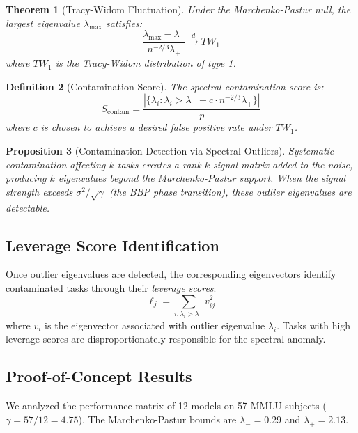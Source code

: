 \documentclass[11pt]{article}
\newtheorem{theorem}{Theorem}[section]
\newtheorem{definition}[theorem]{Definition}
\newtheorem{proposition}[theorem]{Proposition}
\begin{document}
\begin{theorem}[Tracy-Widom Fluctuation]
Under the Marchenko-Pastur null, the largest eigenvalue $\lambda_{\max}$ satisfies:
\begin{equation}
\frac{\lambda_{\max} - \lambda_+}{n^{-2/3} \lambda_+} \xrightarrow{d} TW_1
\end{equation}
where $TW_1$ is the Tracy-Widom distribution of type 1.
\end{theorem}

\begin{definition}[Contamination Score]
The \emph{spectral contamination score} is:
\begin{equation}
S_{\text{contam}} = \frac{|\{\lambda_i : \lambda_i > \lambda_+ + c \cdot n^{-2/3}\lambda_+\}|}{p}
\end{equation}
where $c$ is chosen to achieve a desired false positive rate under $TW_1$.
\end{definition}

\begin{proposition}[Contamination Detection via Spectral Outliers]
Systematic contamination affecting $k$ tasks creates a rank-$k$ signal matrix added to the noise, producing $k$ eigenvalues beyond the Marchenko-Pastur support. When the signal strength exceeds $\sigma^2/\sqrt{\gamma}$ (the BBP phase transition), these outlier eigenvalues are detectable.
\end{proposition}

\subsection{Leverage Score Identification}

Once outlier eigenvalues are detected, the corresponding eigenvectors identify contaminated tasks through their \emph{leverage scores}:
\begin{equation}
\ell_j = \sum_{i: \lambda_i > \lambda_+} v_{ij}^2
\end{equation}
where $v_i$ is the eigenvector associated with outlier eigenvalue $\lambda_i$. Tasks with high leverage scores are disproportionately responsible for the spectral anomaly.

\subsection{Proof-of-Concept Results}

We analyzed the performance matrix of 12 models on 57 MMLU subjects ($\gamma = 57/12 = 4.75$). The Marchenko-Pastur bounds are $\lambda_- = 0.29$ and $\lambda_+ = 2.13$.
\end{document}
